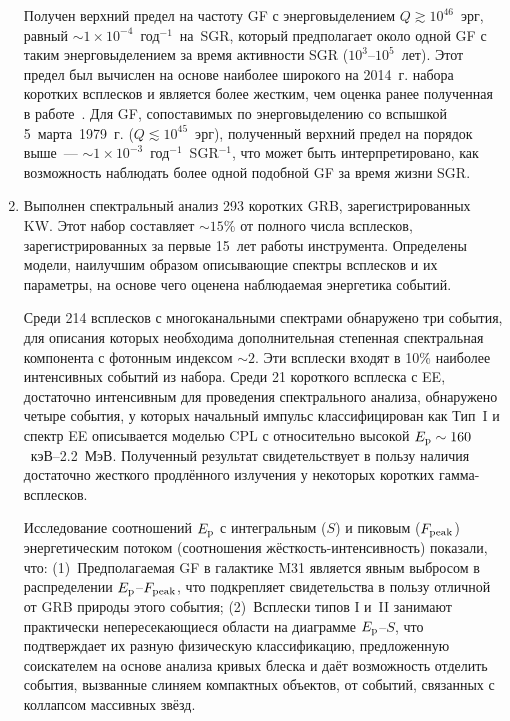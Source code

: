 \begin{enumerate}
    Получен верхний предел на частоту GF с энерговыделением $Q \gtrsim 10^{46}$~эрг, равный
    $\sim 1 \times 10^{-4}$~год$^{-1}$~на~SGR, который предполагает 
    около одной GF с таким энерговыделением за время активности SGR ($10^3\textrm{--}10^5$~лет). 
    Этот предел был вычислен на основе наиболее широкого на 2014~г.  
    набора коротких всплесков и является более жестким, чем оценка ранее полученная в работе~\citep{Ofek_2007ApJ}.
    Для GF, сопоставимых по энерговыделению со вспышкой 5~марта~1979~г. ($Q \lesssim 10^{45}$~эрг), 
    полученный верхний предел на порядок выше~--- $\sim 1\times 10^{-3}$~год$^{-1}$~SGR$^{-1}$, 
    что может быть интерпретировано, как возможность наблюдать более одной подобной GF за время жизни SGR.
  
\item Выполнен спектральный анализ 293 коротких GRB, зарегистрированных KW. 
    Этот набор составляет $\sim 15$\% от полного числа всплесков, зарегистрированных 
    за первые 15~лет работы инструмента.
    Определены модели, наилучшим образом описывающие спектры всплесков и их параметры,
    на основе чего оценена наблюдаемая энергетика событий. 
    
    Среди 214 всплесков с многоканальными спектрами обнаружено три
    события, для описания которых необходима дополнительная степенная 
    спектральная компонента с фотонным индексом $\sim 2$. Эти всплески входят в 10\%
    наиболее интенсивных событий из набора. 
    Среди 21 короткого всплеска с EE, достаточно интенсивным
    для проведения спектрального анализа, обнаружено четыре события, у которых 
    начальный импульс классифицирован как Тип~I и спектр EE описывается моделью CPL 
    с относительно высокой $E_{\mathrm{p}} \sim 160$~кэВ--2.2~МэВ. Полученный результат свидетельствует  
    в пользу наличия достаточно жесткого продлённого излучения у некоторых коротких гамма-всплесков. 
    
    Исследование соотношений $E_{\mathrm{p}}$ с интегральным ($S$) и пиковым ($F_{\mathrm{peak}}$) 
    энергетическим потоком (соотношения жёсткость-интенсивность) показали, что:
    (1)~Предполагаемая GF в галактике M31 является явным выбросом в распределении 
    $E_{\mathrm{p}}$--$F_{\mathrm{peak}}$,  что подкрепляет свидетельства в пользу отличной 
    от GRB природы этого события;
    (2)~Всплески типов I и~II занимают практически непересекающиеся области 
    на диаграмме $E_{\mathrm{p}}$--$S$, что подтверждает их разную физическую классификацию, 
    предложенную соискателем на основе анализа кривых блеска и даёт возможность отделить события, 
    вызванные слиняем компактных объектов, от событий, связанных с коллапсом массивных звёзд.
  
\end{enumerate}


